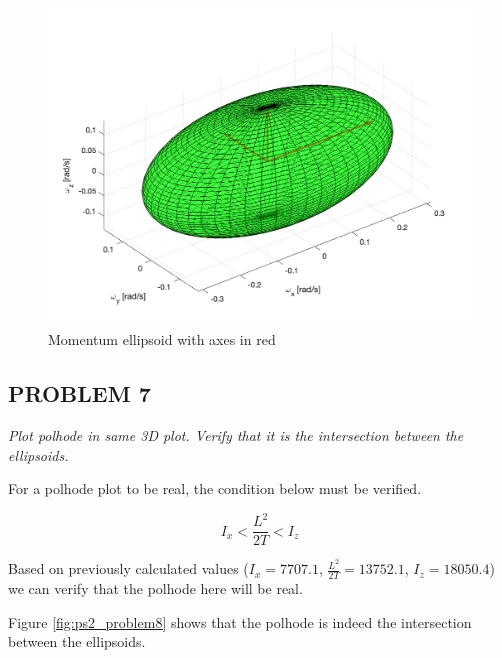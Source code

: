 \begin{figure}[H]
\centering
\includegraphics[scale=0.5]{Images/ps2_problem6_momentum.png}
\caption{Momentum ellipsoid with axes in red}
\label{fig:ps2_problem6_momentum}
\end{figure}


\subsection{PROBLEM 7}
\textit{Plot polhode in same 3D plot. Verify that it is the intersection between the ellipsoids.}

For a polhode plot to be real, the condition below must be verified.

\begin{equation*}
    I_x < \frac{L^2}{2T} < I_z
\end{equation*}

Based on previously calculated values ($I_x = 7707.1$, $\frac{L^2}{2T} = 13752.1$, $I_z = 18050.4$) we can verify that the polhode here will be real.

Figure \ref{fig:ps2_problem8} shows that the polhode is indeed the intersection between the ellipsoids.

